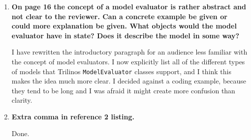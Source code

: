 \documentclass[11pt]{article}
\begin{document}
\begin{enumerate}
\item {\bf On page 16 the concept of a model evaluator is rather abstract and not clear to the reviewer.  Can a concrete example be given or could more explanation be given. What objects would the model evaluator have in state? Does it describe the model in some way?}

I have rewritten the introductory paragraph for an audience less familiar with the concept of model evaluators.  I now explicitly list all of the different types of models that Trilinos {\tt ModelEvaluator} classes support, and I think this makes the idea much more clear.  I decided against a coding example, because they tend to be long and I was afraid it might create more confusion than clarity.

\item {\bf Extra comma in reference 2 listing.}

Done.

\end{enumerate}
\end{document}
